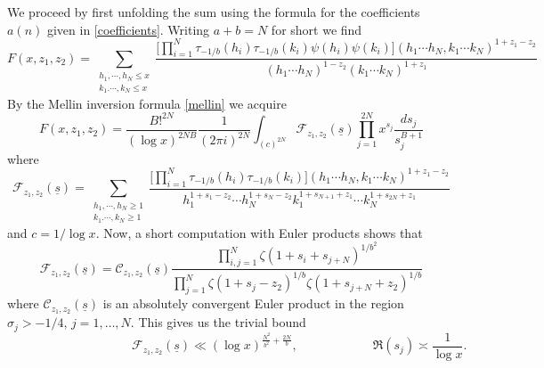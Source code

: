 \documentclass[oneside, 12pt]{amsart}
\theoremstyle{definition}
\newcommand{\mc}{\mathcal}
\newcommand{\leqs}{\leqslant }
\newcommand{\geqs}{\geqslant }
\begin{document}
We proceed by first unfolding the sum using the formula for the coefficients $a(n)$ given in \eqref{coefficients}. Writing $a+b=N$ for short we find 
\[
F(x,z_1,z_2) =\!\!\!\!\! \sum_{\substack{h_1,\cdots, h_N\leqs x\\k_1.\cdots,k_N\leqs x}}
                         \frac{\Big[\prod_{i=1}^N \tau_{-1/b}(h_i)\tau_{-1/b}(k_i)\psi(h_i)\psi(k_i)\Big]( h_1\cdots h_N,k_1\cdots k_N)^{1+z_1-z_2}}{(h_1\cdots h_N)^{1-z_2}(k_1\cdots k_N)^{1+z_1}}
\]
By the Mellin inversion formula \eqref{mellin} we acquire
\begin{equation*}
F(x,z_1,z_2) = 
\frac{B!^{2N}}{(\log x)^{2NB}}\frac{1}{(2\pi i)^{2N}}\int_{(c)^{2N}}
\mc{F}_{z_1,z_2}(\underline{s})
                        \prod_{j=1}^{2N}x^{s_j}\frac{ds_j}{s_j^{B+1}}
\end{equation*}
where
\[
\mc{F}_{z_1,z_2}(\underline{s})= \sum_{\substack{h_1,\cdots, h_N\geqs 1\\k_1.\cdots,k_N\geqs 1}}
                         \frac{\Big[\prod_{i=1}^N \tau_{-1/b}(h_i)\tau_{-1/b}(k_i)\Big]( h_1\cdots h_N,k_1\cdots k_N)^{1+z_1-z_2}}
                        {h_1^{1+s_1-z_2}\cdots h_N^{1+s_N-z_2}k_1^{1+s_{N+1}+z_1}\cdots k_N^{1+s_{2N}+z_1}}
\]
and $c= 1/\log x$. Now, a short computation with Euler products shows that 
\begin{equation}\label{F euler}
\mc{F}_{z_1,z_2}(\underline{s})=\mc{C}_{z_1,z_2}(\underline{s})
\frac{\prod_{i,j=1}^N\zeta(1+s_i+s_{j+N})^{1/b^2}}
{\prod_{j=1}^{N}\zeta(1+s_j-z_2)^{1/b}\zeta(1+s_{j+N}+z_2)^{1/b}}
\end{equation}
where $\mc{C}_{z_1,z_2}(\underline{s})$ is an absolutely convergent Euler product in the region $\sigma_j>-1/4$, $j=1,\ldots, N$. This gives us the trivial bound 
\begin{equation}\label{F bound}
\qquad\qquad \qquad \qquad\qquad\mc{F}_{z_1,z_2}(\underline{s})\ll (\log x)^{\frac{N^2}{b^2}+\frac{2N}{b}}, \qquad\qquad\qquad \Re(s_j)\asymp\frac{1}{\log x}.
\end{equation}
\end{document}
